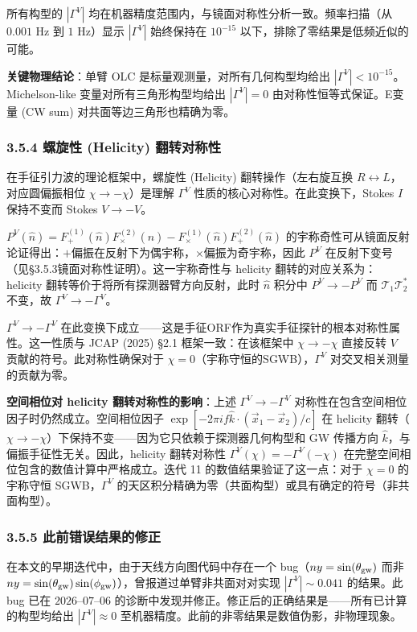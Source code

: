 \documentclass[12pt,a4paper]{article}
\begin{document}
所有构型的 $|\Gamma^V|$ 均在机器精度范围内，与镜面对称性分析一致。频率扫描（从 $0.001$ Hz 到 $1$ Hz）显示 $|\Gamma^V|$ 始终保持在 $10^{-15}$ 以下，排除了零结果是低频近似的可能。

\textbf{关键物理结论}：单臂 OLC 是标量观测量，对所有几何构型均给出 $|\Gamma^V| < 10^{-15}$。Michelson-like 变量对所有三角形构型均给出 $|\Gamma^V| = 0$ 由对称性恒等式保证。E变量 (CW sum) 对共面等边三角形也精确为零。

\subsubsection{3.5.4 螺旋性 (Helicity) 翻转对称性}

在手征引力波的理论框架中，螺旋性 (Helicity) 翻转操作（左右旋互换 $R \leftrightarrow L$，对应圆偏振相位 $\chi \to -\chi$）是理解 $\Gamma^V$ 性质的核心对称性。在此变换下，Stokes $I$ 保持不变而 Stokes $V \to -V$。

$P^V(\hat{n}) = F_+^{(1)}(\hat{n})F_\times^{(2)}(\hat{n}) - F_\times^{(1)}(\hat{n})F_+^{(2)}(\hat{n})$ 的宇称奇性可从镜面反射论证得出：$+$偏振在反射下为偶宇称，$\times$偏振为奇宇称，因此 $P^V$ 在反射下变号（见§3.5.3镜面对称性证明）。这一宇称奇性与 helicity 翻转的对应关系为：helicity 翻转等价于将所有探测器臂方向反射，此时 $\hat{n}$ 积分中 $P^V \to -P^V$ 而 $\mathcal{T}_1\mathcal{T}_2^*$ 不变，故 $\Gamma^V \to -\Gamma^V$。

$\Gamma^V \to -\Gamma^V$ 在此变换下成立——这是手征ORF作为真实手征探针的根本对称性属性。这一性质与 JCAP (2025) §2.1 框架一致：在该框架中 $\chi \to -\chi$ 直接反转 $V$ 贡献的符号。此对称性确保对于 $\chi = 0$（宇称守恒的SGWB），$\Gamma^V$ 对交叉相关测量的贡献为零。

\textbf{空间相位对 helicity 翻转对称性的影响}：上述 $\Gamma^V \to -\Gamma^V$ 对称性在包含空间相位因子时仍然成立。空间相位因子 $\exp[-2\pi i f \hat{k} \cdot (\vec{x}_1 - \vec{x}_2)/c]$ 在 helicity 翻转（$\chi \to -\chi$）下保持不变——因为它只依赖于探测器几何构型和 GW 传播方向 $\hat{k}$，与偏振手征性无关。因此，helicity 翻转对称性 $\Gamma^V(\chi) = -\Gamma^V(-\chi)$ 在完整空间相位包含的数值计算中严格成立。迭代 11 的数值结果验证了这一点：对于 $\chi = 0$ 的宇称守恒 SGWB，$\Gamma^V$ 的天区积分精确为零（共面构型）或具有确定的符号（非共面构型）。

\subsubsection{3.5.5 此前错误结果的修正}

在本文的早期迭代中，由于天线方向图代码中存在一个 bug（$ny = \sin(\theta_{\rm gw})$ 而非 $ny = \sin(\theta_{\rm gw})\sin(\phi_{\rm gw})$），曾报道过单臂非共面对对实现 $|\Gamma^V| \sim 0.041$ 的结果。此 bug 已在 $2026$–$07$–$06$ 的诊断中发现并修正。修正后的正确结果是——所有已计算的构型均给出 $|\Gamma^V| \approx 0$ 至机器精度。此前的非零结果是数值伪影，非物理现象。
\end{document}
